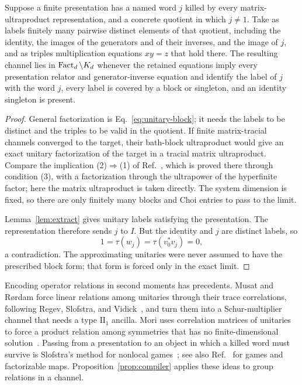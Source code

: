 \documentclass[11pt]{article}
\begin{document}
\begin{proposition}\label{prop:compiler}
Suppose a finite presentation has a named word $j$ killed by every matrix-ultraproduct
representation, and a concrete quotient in which $j\ne1$. Take as labels finitely many
pairwise distinct elements of that quotient, including the identity, the images of the
generators and of their inverses, and the image of $j$, and as triples multiplication
equations $xy=z$ that hold there. The resulting channel lies in
$\operatorname{Fact}_d\setminus K_d$ whenever the retained equations imply every presentation relator and
generator-inverse equation and identify the label of $j$ with the word $j$, every label is
covered by a block or singleton, and an identity singleton is present.
\end{proposition}
\begin{proof}
General factorization is Eq.~\eqref{eq:unitary-block}; it needs the labels to be distinct
and the triples to be valid in the quotient. If finite matrix-tracial channels converged to
the target, their bath-block ultraproduct would give an exact unitary factorization of the
target in a tracial matrix ultraproduct. Compare the implication (2)$\Rightarrow$(1) of
Ref.~\cite[Theorem~3.6]{hm15}, which is proved there through condition (3), with a
factorization through the ultrapower of the hyperfinite factor; here the matrix ultraproduct
is taken directly. The system dimension is fixed, so there are only finitely many blocks and
Choi entries to pass to the limit.

Lemma~\ref{lem:extract} gives unitary labels satisfying the presentation. The representation
therefore sends $j$ to $I$. But the identity and $j$ are distinct labels, so
\[
 1=\tau(w_j)=\tau(v_0^*v_j)=0,
\]
a contradiction. The approximating unitaries were never assumed to have the prescribed
block form; that form is forced only in the exact limit.
\end{proof}

Encoding operator relations in second moments has precedents. Musat and R\o rdam force
linear relations among unitaries through their trace correlations, following Regev,
Slofstra, and Vidick~\cite[Proposition~3.2]{mr}, and turn them into a Schur-multiplier
channel that needs a type $\mathrm{II}_1$ ancilla. Mori uses correlation matrices of unitaries
to force a product relation among symmetries that has no finite-dimensional
solution~\cite{mori}. Passing from a
presentation to an object in which a killed word must survive is Slofstra's method for
nonlocal games~\cite{slofstra}; see also Ref.~\cite{pr} for games and factorizable maps.
Proposition~\ref{prop:compiler} applies these ideas to group relations in a channel.
\end{document}
